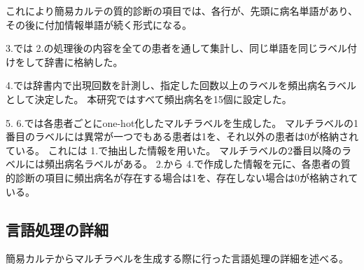 これにより簡易カルテの質的診断の項目では、各行が、先頭に病名単語があり、その後に付加情報単語が続く形式になる。

3.では 2.の処理後の内容を全ての患者を通して集計し、同じ単語を同じラベル付けをして辞書に格納した。 

4.では辞書内で出現回数を計測し、指定した回数以上のラベルを頻出病名ラベルとして決定した。
本研究ではすべて頻出病名を15個に設定した。

 5. 6.では各患者ごとにone-hot化したマルチラベルを生成した。
マルチラベルの1番目のラベルには異常が一つでもある患者は1を、それ以外の患者は0が格納されている。
これには 1.で抽出した情報を用いた。
マルチラベルの2番目以降のラベルには頻出病名ラベルがある。 
2.から 4.で作成した情報を元に、各患者の質的診断の項目に頻出病名が存在する場合は1を、存在しない場合は0が格納されている。

\subsection{言語処理の詳細}
\label{sec:nl}
簡易カルテからマルチラベルを生成する際に行った言語処理の詳細を述べる。
